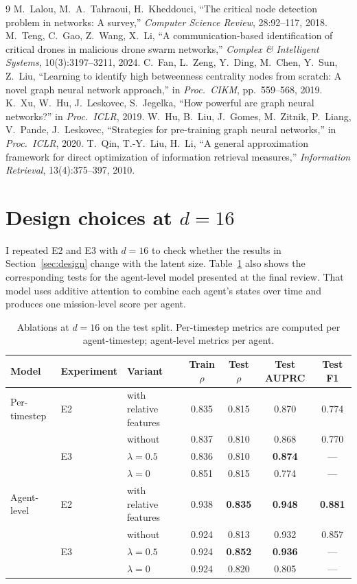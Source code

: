 \documentclass[11pt,a4paper]{article}
\begin{document}
\begin{thebibliography}{9}\small
{} M.~Lalou, M.~A.~Tahraoui, H.~Kheddouci, ``The critical node detection problem in networks: A survey,'' \emph{Computer Science Review}, 28:92--117, 2018.
 M.~Teng, C.~Gao, Z.~Wang, X.~Li, ``A communication-based identification of critical drones in malicious drone swarm networks,'' \emph{Complex \& Intelligent Systems}, 10(3):3197--3211, 2024.
 C.~Fan, L.~Zeng, Y.~Ding, M.~Chen, Y.~Sun, Z.~Liu, ``Learning to identify high betweenness centrality nodes from scratch: A novel graph neural network approach,'' in \emph{Proc.\ CIKM}, pp.~559--568, 2019.
 K.~Xu, W.~Hu, J.~Leskovec, S.~Jegelka, ``How powerful are graph neural networks?'' in \emph{Proc.\ ICLR}, 2019.
 W.~Hu, B.~Liu, J.~Gomes, M.~Zitnik, P.~Liang, V.~Pande, J.~Leskovec, ``Strategies for pre-training graph neural networks,'' in \emph{Proc.\ ICLR}, 2020.
 T.~Qin, T.-Y.~Liu, H.~Li, ``A general approximation framework for direct optimization of information retrieval measures,'' \emph{Information Retrieval}, 13(4):375--397, 2010.
\end{thebibliography}


\clearpage
\appendix
\section{Design choices at $d=16$}\label{app:d16}
I repeated E2 and E3 with $d=16$ to check whether the results in Section~\ref{sec:design} change with
the latent size. Table~\ref{tab:d16} also shows the corresponding tests for the agent-level model
presented at the final review. That model uses additive attention to combine each agent's states
over time and produces one mission-level score per agent.

\begin{table}[!htbp]\centering\small
\caption{Ablations at $d=16$ on the test split. Per-timestep metrics are computed per agent-timestep; agent-level metrics per agent.}\label{tab:d16}
\begin{tabular}{@{}lllcccc@{}}\toprule
Model & Experiment & Variant & Train $\rho$ & Test $\rho$ & Test AUPRC & Test F1\\\midrule
Per-timestep & E2 & with relative features & 0.835 & 0.815 & 0.870 & 0.774\\
 & & without & 0.837 & 0.810 & 0.868 & 0.770\\
 & E3 & $\lambda=0.5$ & 0.836 & 0.810 & \textbf{0.874} & ---\\
 & & $\lambda=0$ & 0.851 & 0.815 & 0.774 & ---\\\midrule
Agent-level & E2 & with relative features & 0.938 & \textbf{0.835} & \textbf{0.948} & \textbf{0.881}\\
 & & without & 0.924 & 0.813 & 0.932 & 0.857\\
 & E3 & $\lambda=0.5$ & 0.924 & \textbf{0.852} & \textbf{0.936} & ---\\
 & & $\lambda=0$ & 0.924 & 0.820 & 0.805 & ---\\\bottomrule
\end{tabular}
\end{table}
\end{document}
